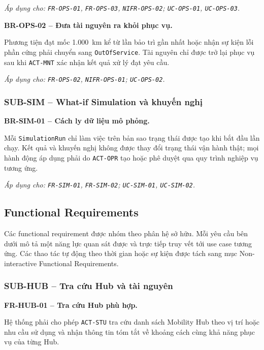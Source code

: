 \textit{Áp dụng cho: \texttt{FR-OPS-01}, \texttt{FR-OPS-03}, \texttt{NIFR-OPS-02}; \texttt{UC-OPS-01}, \texttt{UC-OPS-03}.}

\medskip
\noindent\textbf{BR-OPS-02 -- Đưa tài nguyên ra khỏi phục vụ.}\par
\nopagebreak[4]
Phương tiện đạt mốc 1.000~km kể từ lần bảo trì gần nhất hoặc nhận sự kiện lỗi phần cứng phải chuyển sang \texttt{OutOfService}. Tài nguyên chỉ được trở lại phục vụ sau khi \texttt{ACT-MNT} xác nhận kết quả xử lý đạt yêu cầu.

\textit{Áp dụng cho: \texttt{FR-OPS-02}, \texttt{NIFR-OPS-01}; \texttt{UC-OPS-02}.}

\subsubsection{SUB-SIM -- What-if Simulation và khuyến nghị}

\noindent\textbf{BR-SIM-01 -- Cách ly dữ liệu mô phỏng.}\par
\nopagebreak[4]
Mỗi \texttt{SimulationRun} chỉ làm việc trên bản sao trạng thái được tạo khi bắt đầu lần chạy. Kết quả và khuyến nghị không được thay đổi trạng thái vận hành thật; mọi hành động áp dụng phải do \texttt{ACT-OPR} tạo hoặc phê duyệt qua quy trình nghiệp vụ tương ứng.

\textit{Áp dụng cho: \texttt{FR-SIM-01}, \texttt{FR-SIM-02}; \texttt{UC-SIM-01}, \texttt{UC-SIM-02}.}

\subsection{Functional Requirements}

Các functional requirement được nhóm theo phân hệ sở hữu. Mỗi yêu cầu bên dưới mô tả một năng lực quan sát được và trực tiếp truy vết tới use case tương ứng. Các thao tác tự động theo thời gian hoặc sự kiện được tách sang mục Non-interactive Functional Requirements.

\subsubsection{SUB-HUB -- Tra cứu Hub và tài nguyên}

\noindent\textbf{FR-HUB-01 -- Tra cứu Hub phù hợp.}\par
\nopagebreak[4]
Hệ thống phải cho phép \texttt{ACT-STU} tra cứu danh sách Mobility Hub theo vị trí hoặc nhu cầu sử dụng và nhận thông tin tóm tắt về khoảng cách cùng khả năng phục vụ của từng Hub.

